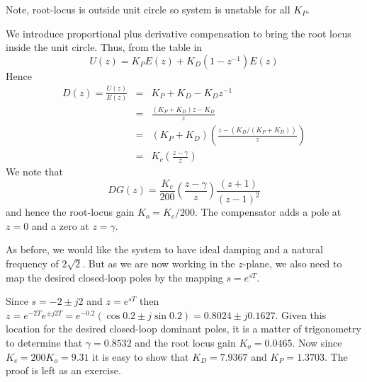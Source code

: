 \begin{slide}\label{slides:l12s18}
	\begin{center}
	\end{center}	
	Note, root-locus is outside unit circle so system is unstable for all $K_P$.
\end{slide}

We introduce proportional plus derivative compensation to bring the root locus inside the unit circle. Thus, from the table in  $$U(z)=K_PE(z)+K_D(1-z^{-1})E(z)$$ Hence
\begin{eqnarray*}
	D(z) = \frac{U(z)}{E(z)} & = & K_P + K_D - K_D z^{-1} \\
	& = & \frac{(K_P+K_D)z - K_D}{z} \\
	& = & (K_P+K_D)\left(\frac{z-(K_D/(K_P+K_D))}{z}\right) \\
	& = & K_c\left(\frac{z-\gamma}{z}\right)
\end{eqnarray*}
We note that $$DG(z)=\frac{K_c}{200}\left(\frac{z-\gamma}{z}\right)\frac{(z+1)}{(z-1)^2}$$ and hence the root-locus gain $K_o=K_c/200$. The compensator adds a pole at $z=0$ and a zero at $z=\gamma$.

As before, we would like the system to have ideal damping and a natural frequency of $2\sqrt{2}$. But as we are now working in the $z$-plane, we also need to map the desired closed-loop poles by the mapping $s=e^{sT}$.

Since $s=-2\pm j2$ and $z=e^{sT}$ then $z=e^{-2T}e^{\pm j2T} = e^{-0.2}(\cos0.2\pm j\sin0.2) = 0.8024\pm j0.1627$. Given this location for the desired closed-loop dominant poles, it is a matter of trigonometry to determine that $\gamma=0.8532$ and the root locus gain $K_o=0.0465$. Now since $K_c=200 K_o = 9.31$ it is easy to show that $K_D=7.9367$ and $K_P=1.3703.$ The proof is left as an exercise.

\endinput

